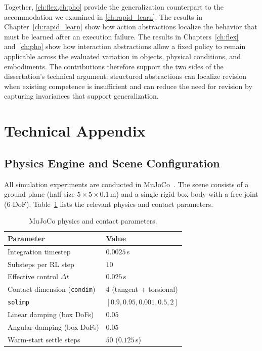 Together, \cref{ch:flex,ch:pho} provide the generalization counterpart to the accommodation we examined in \cref{ch:rapid_learn}. The results in Chapter~\ref{ch:rapid_learn} show how action abstractions localize the behavior that must be learned after an execution failure. The results in Chapters~\ref{ch:flex} and~\ref{ch:pho} show how interaction abstractions allow a fixed policy to remain applicable across the evaluated variation in objects, physical conditions, and embodiments. The contributions therefore support the two sides of the dissertation's technical argument: structured abstractions can localize revision when existing competence is insufficient and can reduce the need for revision by capturing invariances that support generalization.

\section{Technical Appendix}
\label{sec:pho_technical_appendix}

\subsection{Physics Engine and Scene Configuration}

All simulation experiments are conducted in MuJoCo~\cite{todorov2012mujoco}.
The scene consists of a ground plane (half-size $5 \times 5 \times 0.1$\,m) and a single rigid box body with a free joint (6-DoF).
Table~\ref{tab:mujoco_physics} lists the relevant physics and contact parameters.

\begin{table}[h]
\centering
\caption{MuJoCo physics and contact parameters.}
\label{tab:mujoco_physics}
\begin{tabular}{ll}
\toprule
\textbf{Parameter}              & \textbf{Value}              \\
\midrule
Integration timestep            & $0.0025$\,s                 \\
Substeps per RL step            & $10$                        \\
Effective control $\Delta t$    & $0.025$\,s                  \\
Contact dimension (\texttt{condim}) & $4$ (tangent + torsional) \\
\texttt{solimp}                 & $[0.9, 0.95, 0.001, 0.5, 2]$ \\
Linear damping (box DoFs)       & $0.05$                      \\
Angular damping (box DoFs)      & $0.05$                      \\
Warm-start settle steps         & $50$ ($0.125$\,s)           \\
\bottomrule
\end{tabular}
\end{table}

